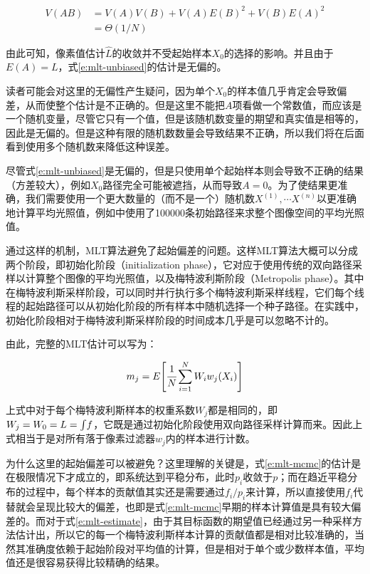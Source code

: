 \begin{equation}
\begin{aligned}
	V(AB)&=V(A)V(B)+V(A)E(B)^{2}+V(B)E(A)^{2}\\
	     &=\Theta(1/N)
\end{aligned}
\end{equation}

由此可知，像素值估计$\hat{L}$的收敛并不受起始样本$X_0$的选择的影响。并且由于$E(A)={L}$，式\ref{e:mlt-unbiased}的估计是无偏的。

\begin{myshaded}
	读者可能会对这里的无偏性产生疑问，因为单个$X_0$的样本值几乎肯定会导致偏差，从而使整个估计是不正确的。但是这里不能把$A$项看做一个常数值，而应该是一个随机变量，尽管它只有一个值，但是该随机数变量的期望和真实值是相等的，因此是无偏的。但是这种有限的随机数数量会导致结果不正确，所以我们将在后面看到使用多个随机数来降低这种误差。
\end{myshaded}

尽管式\ref{e:mlt-unbiased}是无偏的，但是只使用单个起始样本则会导致不正确的结果（方差较大），例如${X}_0$路径完全可能被遮挡，从而导致$A=0$。为了使结果更准确，我们需要使用一个更大数量的（而不是一个）随机数${X}^{(1)},\cdots{X}^{(n)}$以更准确地计算平均光照值，例如\cite{b:pbrt}中使用了100000条初始路径来求整个图像空间的平均光照值。

通过这样的机制，MLT算法避免了起始偏差的问题。这样MLT算法大概可以分成两个阶段，即初始化阶段（initialization phase），它对应于使用传统的双向路径采样以计算整个图像的平均光照值，以及梅特波利斯阶段（Metropolis phase）。其中在梅特波利斯采样阶段，可以同时并行执行多个梅特波利斯采样线程，它们每个线程的起始路径可以从初始化阶段的所有样本中随机选择一个种子路径。在实践中，初始化阶段相对于梅特波利斯采样阶段的时间成本几乎是可以忽略不计的。

由此，完整的MLT估计可以写为：

\begin{equation}\label{e:mlt-estimate}
	m_j=E\Biggl[  \cfrac{1}{N}\sum^{N}_{i=1}W_iw_j({X}_i)\Biggl]
\end{equation}

上式中对于每个梅特波利斯样本的权重系数$W_j$都是相同的，即$W_j=W_0={L}={\rm \int} f$，它既是通过初始化阶段使用双向路径采样计算而来。因此上式相当于是对所有落于像素过滤器$w_j$内的样本进行计数。

\begin{myshaded}
	为什么这里的起始偏差可以被避免？这里理解的关键是，式\ref{e:mlt-mcmc}的估计是在极限情况下才成立的，即系统达到平稳分布，此时$p_i$收敛于$p$；而在趋近平稳分布的过程中，每个样本的贡献值其实还是需要通过$f_i/p_i$来计算，所以直接使用$f_i$代替就会呈现比较大的偏差，也即是式\ref{e:mlt-mcmc}早期的样本计算值是具有较大偏差的。而对于式\ref{e:mlt-estimate}，由于其目标函数的期望值已经通过另一种采样方法估计出，所以它的每一个梅特波利斯样本计算的贡献值都是相对比较准确的，当然其准确度依赖于起始阶段对平均值的计算，但是相对于单个或少数样本值，平均值还是很容易获得比较精确的结果。
\end{myshaded}

